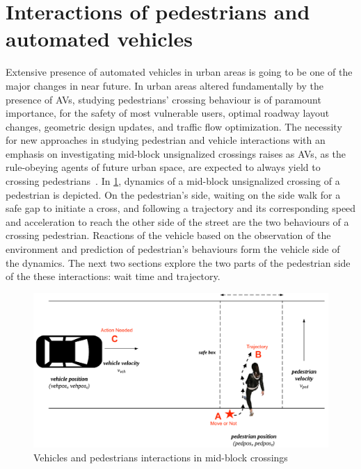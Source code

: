 \section{Interactions of pedestrians and automated vehicles}
\label{chap1b:sec2}
Extensive presence of automated vehicles in urban areas is going to be one of the major changes in near future. In urban areas altered fundamentally by the presence of AVs, studying pedestrians' crossing behaviour is of paramount importance, for the safety of most vulnerable users, optimal roadway layout changes, geometric design updates, and traffic flow optimization. The necessity for new approaches in studying pedestrian and vehicle interactions with an emphasis on investigating mid-block unsignalized crossings raises as AVs, as the rule-obeying agents of future urban space, are expected to always yield to crossing pedestrians~\cite{millard2018pedestrians}. In \cref{fig:frameworkcross}, dynamics of a mid-block unsignalized crossing of a pedestrian is depicted. On the pedestrian's side, waiting on the side walk for a safe gap to initiate a cross, and following a trajectory and its corresponding speed and acceleration to reach the other side of the street are the two behaviours of a crossing pedestrian. Reactions of the vehicle based on the observation of the environment and prediction of pedestrian's behaviours form the vehicle side of the dynamics. The next two sections explore the two parts of the pedestrian side of the these interactions: wait time and trajectory.
\begin{figure}
    \centering
    \includegraphics[scale=0.2]{chapter_1b/figures/ped5.png}
    \caption{Vehicles and pedestrians interactions in mid-block crossings}
    \label{fig:frameworkcross}
\end{figure}

